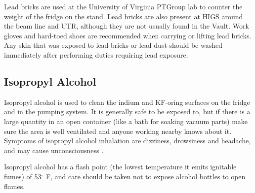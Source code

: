 Lead bricks are used at the University of Virginia PTGroup lab to counter the weight of the fridge on the stand.  Lead bricks are also present at HIGS around the beam line and UTR, although they are not usually found in the Vault.  Work gloves and hard-toed shoes are recommended when carrying or lifting lead bricks.  Any skin that was exposed to lead bricks or lead dust should be washed immediately after performing duties requiring lead exposure.

\subsection{Isopropyl Alcohol}
Isopropyl alcohol is used to clean the indium and KF-oring surfaces on the fridge and in the pumping system.  It is generally safe to be exposed to, but if there is a large quantity in an open container (like a bath for soaking vacuum parts) make sure the area is well ventilated and anyone working nearby knows about it.  Symptoms of isopropyl alcohol inhalation are dizziness, drowsiness and headache, and may cause unconsciousness \cite{isopropmsds}. 

Isopropyl alcohol has a flash point (the lowest temperature it emits ignitable fumes) of 53$^\circ$ F, and care should be taken not to expose alcohol bottles to open flames.
